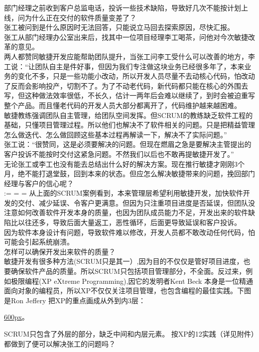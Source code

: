 \documentclass[]{article}
\begin{document}
部门经理之前收到客户总监电话，投诉一些技术缺陷，导致好几次不能按计划上线，问为什么正在交付的软件质量变差了？\\
张工被问到是什么原因时无法回答，只能说立马回去探索原因，尽快汇报。\\
张工从部门经理办公室出来后，找其中一位项目经理李工喝茶，问他对今次敏捷改革的意见。\\
两人都赞同敏捷开发应能帮助团队提升，当张工问李工受什么可以改善的地方，李工说：``让团队自主是件好事，但因为我们专注做这块业务已经很多年了，本来业务的变化不多，只是一些功能小改动，所以开发人员尽量不去动核心代码，怕改动了反而会影响投产，切割不了。为了不动老代码，新代码都只能在核心的外围去写，但这种做法效率很低，不长久，估计一两年后会难以继续了，到时会被迫重写整个产品。而且懂老代码的开发人员大部分都离开了，代码维护越来越困难。\\
敏捷教练强调团队自主管理，给团队空间发挥。但SCRUM的教练缺乏软件工程的基础，只懂项目管理过程。所以他们也解决不了软件相关的问题。只是把精益管理怎么做迭代、怎么做回顾这些基本过程再解读一下，解决不了实际问题。''\\
张工说：``很赞同，这是必须要解决的问题。但现在燃眉之急是要解决主管提出的客户投诉不能按时交付这紧急问题。不然我们以后也不敢再提敏捷开发了。''\\
无论张工或李工也没有能去总结出什么好的解决方案。现在推行敏捷才刚刚3个月，绝不能打退堂鼓，回到本来的状态。但应怎么解决敏捷带来的问题，挽回部门经理与客户的信心呢？\\
:= = =
从上面的SCRUM案例看到，本来管理层希望利用敏捷开发，加快软件开发的交付、减少延误、令客户更满意。但因为只注重项目进度是否延误，但团队没注意如何改善软件开发本身的质量，也因为团队成员能力不足，开发出来的软件缺陷比以往还多，导致后面大量返工，恶性循环，后面更导致延误和客户投诉。\\
因为软件本身设计有问题，导致软件难以修改，开发人员都不敢改动任何代码，怕可能会引起系统崩溃。\\
怎样可以确保开发出来软件的质量？\\
敏捷开发有很多种方法(SCRUM只是其一）,因为目的不仅仅是管好项目进度，也要确保软件产品的质量。所以SCRUM只包括项目管理部分，不全面。反过来，例如极限编程(XP
eXtreme Programming),因它的发明者Kent Beck
本身是一位精通面向对象的编程员，所以XP不仅仅关注项目管理，也包含编程的最佳实践。下图是Ron
Jeffery 把XP的重点画成从外到内3层：

\href{文件:cleanagile_f1.8-1.jpg}{600px}。

SCRUM只包含了外层的部分，缺乏中间和内层元素。
按XP的12实践（详见附件）都做到了便可以解决张工的问题吗？\\
\end{document}

